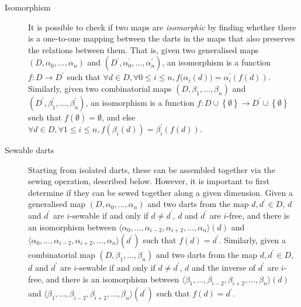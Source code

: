 \begin{description}
\item[Isomorphism]
It is possible to check if two maps are \emph{isomorphic} by finding whether there is a one-to-one mapping between the darts in the maps that also preserves the relations between them.
That is, given two generalised maps $(D,\alpha_{0},\ldots,\alpha_{n})$ and $(D^\prime,\alpha_{0}^\prime,\ldots,\alpha_{n}^\prime)$, an isomorphism is a function $f: D \rightarrow D^\prime$ such that $\forall d \in D, \forall 0 \leq i \leq n, f\big(\alpha_i\left(d\right)\big) = \alpha_i^\prime\left(f\left(d\right)\right)$.
Similarly, given two combinatorial maps $(D, \beta_{1}, \ldots, \beta_{n})$ and $(D^\prime, \beta_{1}^\prime, \ldots, \beta_{n}^\prime)$, an isomorphism is a function $f: D \cup \left\{\emptyset\right\} \rightarrow D^\prime \cup \left\{\emptyset\right\}$ such that $f(\emptyset) = \emptyset$, and else $\forall d \in D, \forall 1 \leq i \leq n, f\left(\beta_i\left(d\right)\right) = \beta_i^\prime\left(f\left(d\right)\right)$.

\item[Sewable darts]
Starting from isolated darts, these can be assembled together via the sewing operation, described below.
However, it is important to first determine if they can be sewed together along a given dimension.
Given a generalised map $(D,\alpha_{0},\ldots,\alpha_{n})$ and two darts from the map $d,d^\prime \in D$, $d$ and $d^\prime$ are $i$-sewable if and only if $d \neq d^\prime$, $d$ and $d^\prime$ are $i$-free, and there is an isomorphism between $\langle\alpha_0, \ldots, \alpha_{i-2}, \alpha_{i+2}, \ldots, \alpha_n\rangle(d)$ and $\langle\alpha_0, \ldots, \alpha_{i-2}, \alpha_{i+2}, \ldots, \alpha_n\rangle(d^\prime)$ such that $f(d) = d^\prime$.
Similarly, given a combinatorial map $(D, \beta_{1}, \ldots, \beta_{n})$ and two darts from the map $d,d^\prime \in D$, $d$ and $d^\prime$ are $i$-sewable if and only if $d \neq d^\prime$, $d$ and the inverse of $d^\prime$ are $i$-free, and there is an isomorphism between $\langle\beta_1, \ldots, \beta_{i-2}, \beta_{i+2}, \ldots, \beta_n\rangle(d)$ and $\langle\beta_1, \ldots, \beta_{i-2}, \beta_{i+2}, \ldots, \beta_n\rangle(d^\prime)$ such that $f(d) = d^\prime$.


\end{description}
